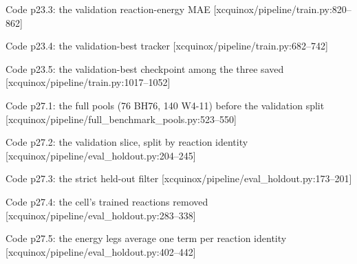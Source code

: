 \begin{frame}[allowframebreaks]{Code p23.3: the validation reaction-energy MAE [xcquinox/pipeline/train.py:820--862]}
\label{code:p23_3_the_validation_reaction_energy_mae}
\end{frame}
\begin{frame}[allowframebreaks]{Code p23.4: the validation-best tracker [xcquinox/pipeline/train.py:682--742]}
\label{code:p23_4_the_validation_best_tracker}
\end{frame}
\begin{frame}[allowframebreaks]{Code p23.5: the validation-best checkpoint among the three saved [xcquinox/pipeline/train.py:1017--1052]}
\label{code:p23_5_the_validation_best_checkpoint_among_the}
\end{frame}
\begin{frame}[allowframebreaks]{Code p27.1: the full pools (76 BH76, 140 W4-11) before the validation split [xcquinox/pipeline/full\_benchmark\_pools.py:523--550]}
\label{code:p27_1_the_full_pools_76_bh76_140_w4_11_before}
\end{frame}
\begin{frame}[allowframebreaks]{Code p27.2: the validation slice, split by reaction identity [xcquinox/pipeline/eval\_holdout.py:204--245]}
\label{code:p27_2_the_validation_slice_split_by_reaction_i}
\end{frame}
\begin{frame}[allowframebreaks]{Code p27.3: the strict held-out filter [xcquinox/pipeline/eval\_holdout.py:173--201]}
\label{code:p27_3_the_strict_held_out_filter}
\end{frame}
\begin{frame}[allowframebreaks]{Code p27.4: the cell's trained reactions removed [xcquinox/pipeline/eval\_holdout.py:283--338]}
\label{code:p27_4_the_cell_s_trained_reactions_removed}
\end{frame}
\begin{frame}[allowframebreaks]{Code p27.5: the energy legs average one term per reaction identity [xcquinox/pipeline/eval\_holdout.py:402--442]}
\label{code:p27_5_the_energy_legs_average_one_term_per_rea}
\end{frame}
